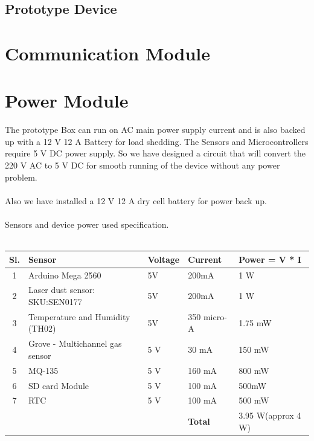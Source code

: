 \subsection {Prototype Device}

\section{Communication Module}

\section{Power Module}
The prototype Box can run on AC main power supply current and is also backed up with a 12 V 12 A Battery for load shedding. The Sensors and Microcontrollers require 5 V DC power supply. So we have designed a circuit that will convert the 220 V AC to 5 V DC for smooth running of the device without any power problem.
\\
\\
Also we have installed a 12 V 12 A dry cell battery for power back up.
\\
\\
Sensors and device power used specification.
\\
\\
\begin{center}
 \begin{tabular}{| c |  p{4cm} | p{3cm} | p{3cm} | p{3cm} |} 
 \hline
 Sl. & Sensor & Voltage & Current & Power = V * I \\ [0.5ex] 
 \hline\hline
 1 & Arduino Mega 2560 & 5V & 200mA & 1 W \\ 
 \hline
 2 & Laser dust sensor: SKU:SEN0177 & 5V & 200mA & 1 W \\
 \hline
 3 & Temperature and Humidity (TH02) & 5V & 350 micro-A & 1.75 mW \\
 \hline
 4 & Grove - Multichannel gas sensor & 5 V & 30 mA & 150 mW \\
 \hline
 5 & MQ-135 & 5 V & 160 mA & 800 mW \\
 \hline
6 & SD card Module & 5 V & 100 mA & 500mW \\
 \hline
7 & RTC & 5 V & 100 mA & 500 mW \\
 \hline
  &   &   &  \textbf{Total} & 3.95 W(approx 4 W) \\
 \hline
\end{tabular}
\end{center}


